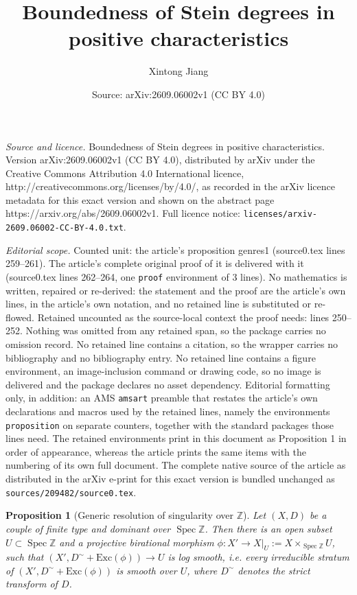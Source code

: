 \documentclass[10pt,a4paper]{amsart}
\title{Boundedness of Stein degrees in positive characteristics}
\author{Xintong Jiang}
\date{Source: arXiv:2609.06002v1 (CC BY 4.0)}
\newtheorem{proposition}{Proposition}
\DeclareMathOperator{\Spec}{Spec}
\begin{document}
\maketitle

\noindent\emph{Source and licence.} Boundedness of Stein degrees in positive characteristics. Version arXiv:2609.06002v1 (CC BY 4.0), distributed by arXiv under the Creative Commons Attribution 4.0 International licence, http://creativecommons.org/licenses/by/4.0/, as recorded in the arXiv licence metadata for this exact version and shown on the abstract page https://arxiv.org/abs/2609.06002v1. Full licence notice: \texttt{licenses/arxiv-2609.06002-CC-BY-4.0.txt}.\par\smallskip

\noindent\textit{Editorial scope.} Counted unit: the article's proposition genres1 (source0.tex lines 259--261). The article's complete original proof of it is delivered with it (source0.tex lines 262--264, one \texttt{proof} environment of 3 lines). No mathematics is written, repaired or re-derived: the statement and the proof are the article's own lines, in the article's own notation, and no retained line is substituted or re-flowed.  Retained uncounted as the source-local context the proof needs: lines 250--252.  Nothing was omitted from any retained span, so the package carries no omission record.  No retained line contains a citation, so the wrapper carries no bibliography and no bibliography entry.  No retained line contains a figure environment, an image-inclusion command or drawing code, so no image is delivered and the package declares no asset dependency.  Editorial formatting only, in addition: an AMS \texttt{amsart} preamble that restates the article's own declarations and macros used by the retained lines, namely the environments \texttt{proposition} on separate counters, together with the standard packages those lines need.  The retained environments print in this document as Proposition 1 in order of appearance, whereas the article prints the same items with the numbering of its own full document.  The complete native source of the article as distributed in the arXiv e-print for this exact version is bundled unchanged as \texttt{sources/209482/source0.tex}.
\begin{proposition}[Generic resolution of singularity over $\mathbb Z$]\label{genres}
    Let $(X,D)$ be a couple of finite type and dominant over $\Spec\mathbb Z$. Then there is an open subset $U\subset \Spec \mathbb Z$ and a projective birational morphism $\phi:X'\to X|_U:=X\times_{\Spec \mathbb Z} U$, such that $(X', D^\sim+\text{Exc}(\phi))\to U$ is log smooth, i.e. every irreducible stratum of $(X',D^\sim+\text{Exc}(\phi))$ is smooth over $U$, where $D^\sim$ denotes the strict transform of $D$.
\end{proposition}
\end{document}
